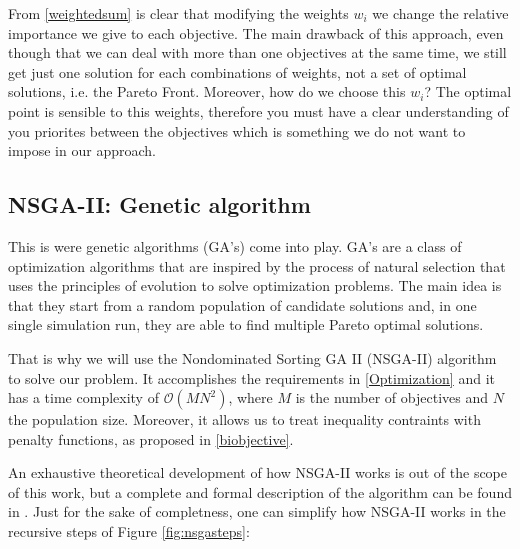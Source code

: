 \documentclass[a4paper,11pt, titlepage, twoside]{article}
\begin{document}
From \ref{weightedsum} is clear that modifying the weights $w_i$ we change the relative importance we give to each objective. The main drawback of this approach, even though that we can deal with more than one objectives at the same time, we
still get just one solution for each combinations of weights, not a set of optimal solutions, i.e. the Pareto Front. Moreover, how do we choose this $w_i$? The optimal point is sensible to this weights, therefore you must have
a clear understanding of you priorites between the objectives which is something we do not want to impose in our approach.\par

\subsection{NSGA-II: Genetic algorithm}\label{NSGAII}



This is were genetic algorithms (GA's) come into play. GA's are a class of optimization algorithms that are inspired by the process of natural selection that uses the principles of evolution to solve optimization problems. The main idea is that they start from a random
population of candidate solutions and, in one single simulation run, they are able to find multiple Pareto optimal solutions. \par

That is why we will use the Nondominated Sorting GA II (NSGA-II) algorithm to solve our problem. It accomplishes the requirements in \ref{Optimization} and it has a time complexity of $\mathcal{O}(MN^2)$, where $M$ is the number of objectives and $N$ the population size.
Moreover, it allows us to treat inequality contraints with penalty functions, as proposed in \ref{biobjective}.\par

An exhaustive theoretical development of how NSGA-II works is out of the scope of this work, but a complete and formal description of the algorithm can be found in \cite{NSGAII}. Just for the sake of completness, one can simplify how NSGA-II works in the recursive steps of Figure \ref{fig:nsgasteps}:
\end{document}
